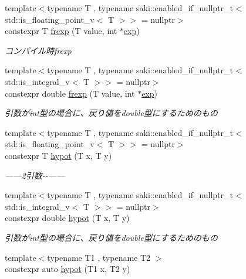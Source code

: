 \begin{DoxyCompactItemize}
{\footnotesize template$<$typename T , typename saki\+::enabled\+\_\+if\+\_\+nullptr\+\_\+t$<$ std\+::is\+\_\+floating\+\_\+point\+\_\+v$<$ T $>$$>$  = nullptr$>$ }\\constexpr T \mbox{\hyperlink{namespacesaki_a00438d1cd099cfd0e2938f9e3defd283}{frexp}} (T value, int $\ast$\mbox{\hyperlink{namespacesaki_abc1268e543a60d43b04f1418f5ef3e41}{exp}})
\begin{DoxyCompactList}\small\item\em コンパイル時frexp \end{DoxyCompactList}\item 
{\footnotesize template$<$typename T , typename saki\+::enabled\+\_\+if\+\_\+nullptr\+\_\+t$<$ std\+::is\+\_\+integral\+\_\+v$<$ T $>$$>$  = nullptr$>$ }\\constexpr double \mbox{\hyperlink{namespacesaki_a915bdd850c89e1ed06c5087790109f11}{frexp}} (T value, int $\ast$\mbox{\hyperlink{namespacesaki_abc1268e543a60d43b04f1418f5ef3e41}{exp}})
\begin{DoxyCompactList}\small\item\em 引数がint型の場合に、戻り値をdouble型にするためのもの \end{DoxyCompactList}\item 
{\footnotesize template$<$typename T , typename saki\+::enabled\+\_\+if\+\_\+nullptr\+\_\+t$<$ std\+::is\+\_\+floating\+\_\+point\+\_\+v$<$ T $>$$>$  = nullptr$>$ }\\constexpr T \mbox{\hyperlink{namespacesaki_a0dfe75bfa0e5223a0390c5e2941e69bc}{hypot}} (T x, T y)
\begin{DoxyCompactList}\small\item\em ------2引数-\/-\/------ \end{DoxyCompactList}\item 
{\footnotesize template$<$typename T , typename saki\+::enabled\+\_\+if\+\_\+nullptr\+\_\+t$<$ std\+::is\+\_\+integral\+\_\+v$<$ T $>$$>$  = nullptr$>$ }\\constexpr double \mbox{\hyperlink{namespacesaki_ad888da163ba5c006d664d564fb48f7a7}{hypot}} (T x, T y)
\begin{DoxyCompactList}\small\item\em 引数がint型の場合に、戻り値をdouble型にするためのもの \end{DoxyCompactList}\item 
{\footnotesize template$<$typename T1 , typename T2 $>$ }\\constexpr auto \mbox{\hyperlink{namespacesaki_add6327614e0d389d7545d1ffb151602b}{hypot}} (T1 x, T2 y)

\end{DoxyCompactItemize}
